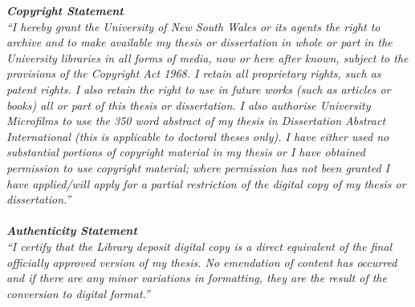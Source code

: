 \begin{center}
\begin{minipage}{0.75\textwidth}
  \vspace{4cm}
  \textit{
    \textbf{Copyright Statement}\\
    ``I hereby grant the University of New South Wales or its agents the right to archive and to make available my thesis or dissertation in whole or part in the University libraries in all forms of media, now or here after known, subject to the provisions of the Copyright Act 1968. I retain all proprietary rights, such as patent rights. I also retain the right to use in future works (such as articles or books) all or part of this thesis or dissertation.
    I also authorise University Microfilms to use the 350 word abstract of my thesis in Dissertation Abstract International (this is applicable to doctoral theses only).
  I have either used no substantial portions of copyright material in my thesis or I have obtained permission to use copyright material; where permission has not been granted I have applied/will apply for a partial restriction of the digital copy of my thesis or dissertation.''\\
  }
  \vspace{2cm}\\
  \textit{
    \textbf{Authenticity Statement}\\
    ``I certify that the Library deposit digital copy is a direct equivalent of the final officially approved version of my thesis. No emendation of content has occurred and if there are any minor variations in formatting, they are the result of the conversion to digital format.''
  }
\end{minipage}
\end{center}
